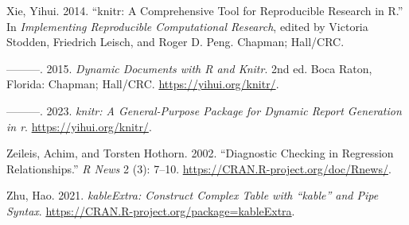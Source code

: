 \documentclass[
  letterpaper,
  paper =a4,
  twoside,
  openright,
  headsepline,
  footsepline,
  listof = totocnumbered,
  chapterprefix = true,
  firstiscover]{scrbook}
\newlength{\cslhangindent}
\newlength{\cslentryspacingunit} %
\newenvironment{CSLReferences}[2] %
 {%
  \setlength{\parindent}{0pt}
  \ifodd #1
  \let\oldpar\par
  \def\par{\hangindent=\cslhangindent\oldpar}
  \fi
  \setlength{\parskip}{#2\cslentryspacingunit}
 }%
 {}
\begin{document}
\begin{CSLReferences}{1}{0}
\leavevmode{}%
Xie, Yihui. 2014. {``{knitr}: A Comprehensive Tool for Reproducible
Research in {R}.''} In \emph{Implementing Reproducible Computational
Research}, edited by Victoria Stodden, Friedrich Leisch, and Roger D.
Peng. Chapman; Hall/CRC.

\leavevmode{}%
---------. 2015. \emph{Dynamic Documents with {R} and Knitr}. 2nd ed.
Boca Raton, Florida: Chapman; Hall/CRC. \url{https://yihui.org/knitr/}.

\leavevmode{}%
---------. 2023. \emph{{knitr}: A General-Purpose Package for Dynamic
Report Generation in r}. \url{https://yihui.org/knitr/}.

\leavevmode{}%
Zeileis, Achim, and Torsten Hothorn. 2002. {``Diagnostic Checking in
Regression Relationships.''} \emph{R News} 2 (3): 7--10.
\url{https://CRAN.R-project.org/doc/Rnews/}.

\leavevmode{}%
Zhu, Hao. 2021. \emph{{kableExtra}: Construct Complex Table with
{``{kable}''} and Pipe Syntax}.
\url{https://CRAN.R-project.org/package=kableExtra}.

\end{CSLReferences}


\backmatter
\end{document}
